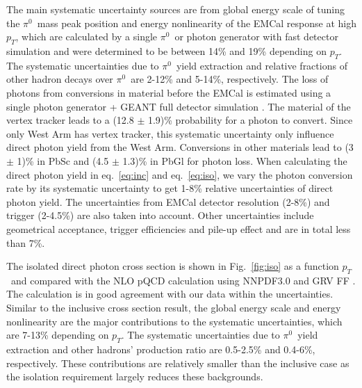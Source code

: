 \documentclass[twocolumn,letterpaper,aps,prl,longbibliography,superscriptaddress,floatfix]{revtex4-2}
\newcommand{\pT}{\ensuremath{p_T}}
\newcommand{\pizero}{\ensuremath{\pi^0}}
\begin{document}
The main systematic uncertainty sources are from global energy scale of tuning the \pizero\ mass peak position and energy nonlinearity of the EMCal response at high \pT, which are calculated by a single \pizero\ or photon generator with fast detector simulation and were determined to be between 14\% and 19\% depending on \pT. The systematic uncertainties due to \pizero\ yield extraction and relative fractions of other hadron decays over \pizero\ are 2-12\% and 5-14\%, respectively. The loss of photons from conversions in material before the EMCal is estimated using a single photon generator + GEANT full detector simulation \cite{Brun:1994aa}. The material of the vertex tracker \cite{SONDHEIM2012993} leads to a (12.8 $\pm$ 1.9)\% probability for a photon to convert. Since only West Arm has vertex tracker, this systematic uncertainty only influence direct photon yield from the West Arm. Conversions in other materials lead to (3 $\pm$ 1)\% in PbSc and (4.5 $\pm$ 1.3)\% in PbGl for photon loss. When calculating the direct photon yield in eq.~\ref{eq:inc} and eq.~\ref{eq:iso}, we vary the photon conversion rate by its systematic uncertainty to get 1-8\% relative uncertainties of direct photon yield. The uncertainties from EMCal detector resolution (2-8\%) and trigger (2-4.5\%) are also taken into account. Other uncertainties include geometrical acceptance, trigger efficiencies and pile-up effect and are in total less than 7\%.

The isolated direct photon cross section is shown in Fig.~\ref{fig:iso} as a function \pT\ and compared with the NLO pQCD calculation \cite{PhysRevD.48.3136,PhysRevD.50.1901} using NNPDF3.0 \cite{Ball2015,Bonvini2015} and GRV FF \cite{PhysRevD.45.3986}. The calculation is in good agreement with our data within the uncertainties. Similar to the inclusive cross section result, the global energy scale and energy nonlinearity are the major contributions to the systematic uncertainties, which are 7-13\% depending on \pT. The systematic uncertainties due to \pizero\ yield extraction and other hadrons' production ratio are 0.5-2.5\% and 0.4-6\%, respectively. These contributions are relatively smaller than the inclusive case as the isolation requirement largely reduces these backgrounds.
\end{document}
